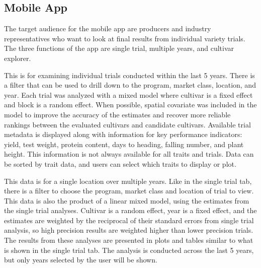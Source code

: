 \documentclass[
  letterpaper,
  DIV=11,
  numbers=noendperiod]{scrreprt}
\begin{document}
\subsection{Mobile App}\label{mobile-app}

The target audience for the mobile app are producers and industry
representatives who want to look at final results from individual
variety trials. The three functions of the app are single trial,
multiple years, and cultivar explorer.

\begin{tcolorbox}[enhanced jigsaw, bottomrule=.15mm, opacityback=0, colback=white, left=2mm, titlerule=0mm, breakable, colframe=quarto-callout-color-frame, colbacktitle=quarto-callout-color!10!white, toprule=.15mm, rightrule=.15mm, coltitle=black, title={Single Trial Explorer}, leftrule=.75mm, toptitle=1mm, bottomtitle=1mm, arc=.35mm, opacitybacktitle=0.6]

This is for examining individual trials conducted within the last 5
years. There is a filter that can be used to drill down to the program,
market class, location, and year. Each trial was analyzed with a mixed
model where cultivar is a fixed effect and block is a random effect.
When possible, spatial covariate was included in the model to improve
the accuracy of the estimates and recover more reliable rankings between
the evaluated cultivars and candidate cultivars. Available trial
metadata is displayed along with information for key performance
indicators: yield, test weight, protein content, days to heading,
falling number, and plant height. This information is not always
available for all traits and trials. Data can be sorted by trait data,
and users can select which traits to display or plot.

\end{tcolorbox}

\begin{tcolorbox}[enhanced jigsaw, bottomrule=.15mm, opacityback=0, colback=white, left=2mm, titlerule=0mm, breakable, colframe=quarto-callout-color-frame, colbacktitle=quarto-callout-color!10!white, toprule=.15mm, rightrule=.15mm, coltitle=black, title={Single Location, Multi-Year Trial Explorer}, leftrule=.75mm, toptitle=1mm, bottomtitle=1mm, arc=.35mm, opacitybacktitle=0.6]

This data is for a single location over multiple years. Like in the
single trial tab, there is a filter to choose the program, market class
and location of trial to view. This data is also the product of a linear
mixed model, using the estimates from the single trial analyses.
Cultivar is a random effect, year is a fixed effect, and the estimates
are weighted by the reciprocal of their standard errors from single
trial analysis, so high precision results are weighted higher than lower
precision trials. The results from these analyses are presented in plots
and tables similar to what is shown in the single trial tab. The
analysis is conducted across the last 5 years, but only years selected
by the user will be shown.

\end{tcolorbox}
\end{document}
